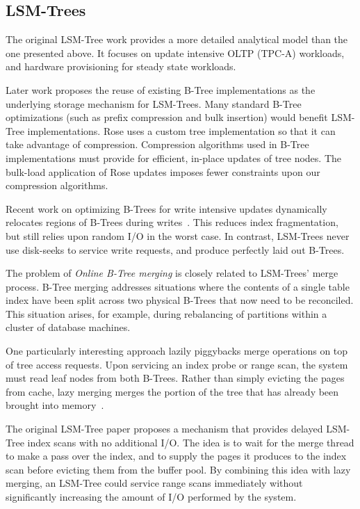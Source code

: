 \documentclass{vldb}
\newcommand{\rows}{Rose\xspace}
\begin{document}
\subsection{LSM-Trees}

The original LSM-Tree work\cite{lsm} provides a more detailed
analytical model than the one presented above.  It focuses on update
intensive OLTP (TPC-A) workloads, and hardware provisioning for steady
state workloads.

Later work proposes the reuse of existing B-Tree implementations as
the underlying storage mechanism for LSM-Trees\cite{cidrPartitionedBTree}.  Many
standard B-Tree optimizations (such as prefix compression and bulk insertion)
would benefit LSM-Tree implementations.  \rows uses a custom tree
implementation so that it can take advantage of compression.
Compression algorithms used in B-Tree implementations must provide for
efficient, in-place updates of tree nodes.  The bulk-load application of
\rows updates imposes fewer constraints upon our compression
algorithms.

Recent work on optimizing B-Trees for write intensive updates dynamically
relocates regions of B-Trees during
writes~\cite{bTreeHighUpdateRates}.  This reduces index fragmentation,
but still relies upon random I/O in the worst case.  In contrast,
LSM-Trees never use disk-seeks to service write requests, and produce
perfectly laid out B-Trees.

The problem of {\em Online B-Tree merging} is closely related to
LSM-Trees' merge process.  B-Tree merging addresses situations where
the contents of a single table index have been split across two
physical B-Trees that now need to be reconciled.  This situation
arises, for example, during rebalancing of partitions within a cluster
of database machines.

One particularly interesting approach lazily piggybacks merge
operations on top of tree access requests.  Upon servicing an index
probe or range scan, the system must read leaf nodes from both B-Trees.
Rather than simply evicting the pages from cache, lazy merging merges
the portion of the tree that has already been brought into
memory~\cite{onlineMerging}.

The original LSM-Tree paper proposes a mechanism that provides delayed
LSM-Tree index scans with no additional I/O.  The idea is to wait for
the merge thread to make a pass over the index, and to supply the
pages it produces to the index scan before evicting them from the
buffer pool.
By combining this idea with lazy merging, an LSM-Tree could service
range scans immediately without significantly increasing the amount of
I/O performed by the system.
\end{document}
